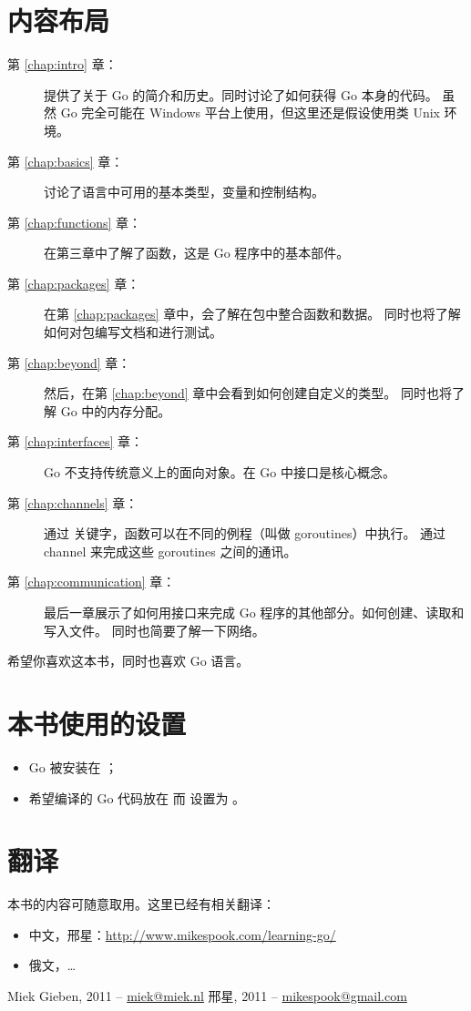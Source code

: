 \section*{内容布局}
\begin{description}
\item[第 \ref{chap:intro} 章：]
提供了关于 Go 的简介和历史。同时讨论了如何获得 Go 本身的代码。
虽然 Go 完全可能在 Windows 平台上使用，但这里还是假设使用类 Unix 环境。

\item[第 \ref{chap:basics} 章：]
讨论了语言中可用的基本类型，变量和控制结构。

\item[第 \ref{chap:functions} 章：]
在第三章中了解了函数，这是 Go 程序中的基本部件。

\item[第 \ref{chap:packages} 章：]
在第 \ref{chap:packages} 章中，会了解在包中整合函数和数据。
同时也将了解如何对包编写文档和进行测试。

\item[第 \ref{chap:beyond} 章：]
然后，在第 \ref{chap:beyond} 章中会看到如何创建自定义的类型。
同时也将了解 Go 中的内存分配。

\item[第 \ref{chap:interfaces} 章：]
Go 不支持传统意义上的面向对象。在 Go 中接口是核心概念。

\item[第 \ref{chap:channels} 章：]
通过  关键字，函数可以在不同的例程（叫做 goroutines）中执行。
通过 channel 来完成这些 goroutines 之间的通讯。

\item[第 \ref{chap:communication} 章：]
最后一章展示了如何用接口来完成 Go 程序的其他部分。如何创建、读取和写入文件。
同时也简要了解一下网络。
\end{description}

希望你喜欢这本书，同时也喜欢 Go 语言。

\section{本书使用的设置}
\label{sec:settings used}
\begin{itemize}                            
\item Go 被安装在 ；
\item 希望编译的 Go 代码放在  
而  设置为 。
\end{itemize}

\section*{翻译}
本书的内容可随意取用。这里已经有相关翻译：
\begin{itemize}
\item 中文，邢星：\url{http://www.mikespook.com/learning-go/}
\item 俄文，\ldots
\end{itemize}

\begin{raggedright}
Miek Gieben, 2011 -- \url{miek@miek.nl}
邢星, 2011 -- \url{mikespook@gmail.com}
\end{raggedright}

